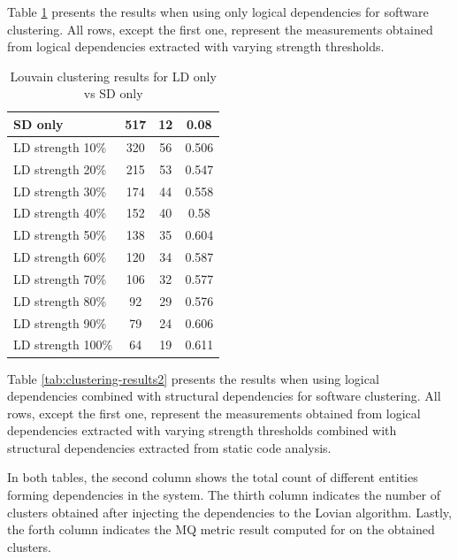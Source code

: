 \documentclass[conference]{IEEEtran}
\begin{document}
Table \ref{tab:clustering-results1} presents the results when using only logical dependencies for software clustering. All rows, except the first one, represent the measurements obtained from logical dependencies extracted with varying strength thresholds.


\begin{table}[htbp]
  \centering
  \caption{Louvain clustering results for LD only vs SD only}
  \label{tab:clustering-results1}
  \begin{tabular}{lc|c|c}
 \midrule
    SD only & 517 & 12 & 0.08 \\
    \midrule
    LD strength 10\% & 320 & 56 & 0.506 \\
    LD strength 20\% & 215 & 53 & 0.547 \\
    LD strength 30\% & 174 & 44 & 0.558 \\
    LD strength 40\% & 152 & 40 & 0.58 \\
    LD strength 50\% & 138 & 35 & 0.604 \\
    LD strength 60\% & 120 & 34 & 0.587 \\
    LD strength 70\% & 106 & 32 & 0.577 \\
    LD strength 80\% & 92 & 29 & 0.576 \\
    LD strength 90\% & 79 & 24 & 0.606 \\
    LD strength 100\% & 64 & 19 & 0.611 \\
    \bottomrule
  \end{tabular}
\end{table}


Table \ref{tab:clustering-results2} presents the results when using logical dependencies combined with structural dependencies for software clustering. All rows, except the first one, represent the measurements obtained from logical dependencies extracted with varying strength thresholds combined with structural dependencies extracted from static code analysis.

In both tables, the second column shows the total count of different entities forming dependencies in the system. The thirth column indicates the number of clusters obtained after injecting the dependencies to the Lovian algorithm. Lastly, the forth column indicates the MQ metric result computed for on the obtained clusters.
\end{document}
